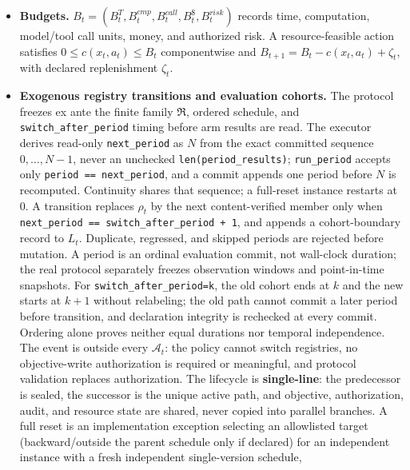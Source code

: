 \documentclass[
  11pt]{article}
\begin{document}
\begin{itemize}
  Unauthorized but canonical write attempts remain in
  \(\mathcal A^{att}_t\) so rejection can be logged; they are not
  silently removed from the action space. Guard acceptance is a
  transition constraint, not a reason to erase the attempt.
\item
  \textbf{Budgets.}
  \(B_t=(B_t^T,B_t^{cmp},B_t^{call},B_t^{\$},B_t^{risk})\) records time,
  computation, model/tool call units, money, and authorized risk. A
  resource-feasible action satisfies \(0\le c(x_t,a_t)\le B_t\)
  componentwise and \(B_{t+1}=B_t-c(x_t,a_t)+\zeta_t\), with declared
  replenishment \(\zeta_t\).
\item
  \textbf{Exogenous registry transitions and evaluation cohorts.} The
  protocol freezes ex ante the finite family \(\mathfrak R\), ordered
  schedule, and \texttt{switch\_after\_period} timing before arm results
  are read. The executor derives read-only \texttt{next\_period} as
  \(N\) from the exact committed sequence \(0,\ldots,N-1\), never an
  unchecked \texttt{len(period\_results)}; \texttt{run\_period} accepts
  only \texttt{period\ ==\ next\_period}, and a commit appends one
  period before \(N\) is recomputed. Continuity shares that sequence; a
  full-reset instance restarts at 0. A transition replaces \(\rho_t\) by
  the next content-verified member only when
  \texttt{next\_period\ ==\ switch\_after\_period\ +\ 1}, and appends a
  cohort-boundary record to \(L_t\). Duplicate, regressed, and skipped
  periods are rejected before mutation. A period is an ordinal
  evaluation commit, not wall-clock duration; the real protocol
  separately freezes observation windows and point-in-time snapshots.
  For \texttt{switch\_after\_period=k}, the old cohort ends at \(k\) and
  the new starts at \(k+1\) without relabeling; the old path cannot
  commit a later period before transition, and declaration integrity is
  rechecked at every commit. Ordering alone proves neither equal
  durations nor temporal independence. The event is outside every
  \(\mathcal A_t\): the policy cannot switch registries, no
  objective-write authorization is required or meaningful, and protocol
  validation replaces authorization. The lifecycle is
  \textbf{single-line}: the predecessor is sealed, the successor is the
  unique active path, and objective, authorization, audit, and resource
  state are shared, never copied into parallel branches. A full reset is
  an implementation exception selecting an allowlisted target
  (backward/outside the parent schedule only if declared) for an
  independent instance with a fresh independent single-version schedule,

\end{itemize}
\end{document}
